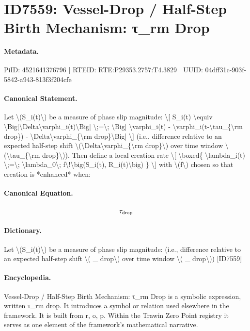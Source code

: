 \section*{ID7559: Vessel-Drop / Half-Step Birth Mechanism: τ\_rm Drop}
\paragraph{Metadata.}
PiID: 4521641376796 | RTEID: RTE:P29353.2757:T4.3829 | UUID: 04dff31c-903f-5842-a943-813f3f204cfe

\paragraph{Canonical Statement.}
Let \textbackslash{}(S\_i(t)\textbackslash{}) be a measure of phase slip magnitude: \textbackslash{}[ S\_i(t) \textbackslash{}equiv \textbackslash{}Big|\textbackslash{}Delta\textbackslash{}varphi\_i(t)\textbackslash{}Big| \textbackslash{};=\textbackslash{}; \textbackslash{}Big| \textbackslash{}varphi\_i(t) - \textbackslash{}varphi\_i(t-\textbackslash{}tau\_\{\textbackslash{}rm drop\}) - \textbackslash{}Delta\textbackslash{}varphi\_\{\textbackslash{}rm drop\}\textbackslash{}Big| \textbackslash{}] (i.e., difference relative to an expected half-step shift \textbackslash{}(\textbackslash{}Delta\textbackslash{}varphi\_\{\textbackslash{}rm drop\}\textbackslash{}) over time window \textbackslash{}(\textbackslash{}tau\_\{\textbackslash{}rm drop\}\textbackslash{})). Then define a local creation rate \textbackslash{}[ \textbackslash{}boxed\{ \textbackslash{}lambda\_i(t) \textbackslash{};=\textbackslash{}; \textbackslash{}lambda\_0\textbackslash{}; f\textbackslash{}!\textbackslash{}big(S\_i(t), R\_i(t)\textbackslash{}big) \} \textbackslash{}] with \textbackslash{}(f\textbackslash{}) chosen so that creation is *enhanced* when:

\paragraph{Canonical Equation.}
\[
\tau_{\rm drop}
\]

\paragraph{Dictionary.}
Let \textbackslash{}(S\_i(t)\textbackslash{}) be a measure of phase slip magnitude: (i.e., difference relative to an expected half-step shift \textbackslash{}( \_ drop\textbackslash{}) over time window \textbackslash{}( \_ drop\textbackslash{})) [ID7559]

\paragraph{Encyclopedia.}
Vessel-Drop / Half-Step Birth Mechanism: τ\_rm Drop is a symbolic expression, written τ\_rm drop. It introduces a symbol or relation used elsewhere in the framework. It is built from r, o, p. Within the Trawin Zero Point registry it serves as one element of the framework's mathematical narrative.
